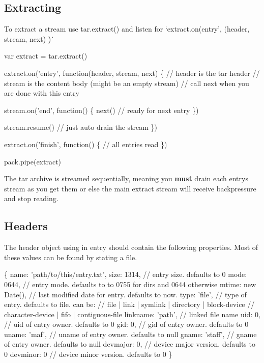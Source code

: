\subsection*{Extracting}

To extract a stream use {\ttfamily tar.\+extract()} and listen for `extract.\+on(\textquotesingle{}entry', (header, stream, next) )\`{}


\begin{DoxyCode}
var extract = tar.extract()

extract.on('entry', function(header, stream, next) \{
  // header is the tar header
  // stream is the content body (might be an empty stream)
  // call next when you are done with this entry

  stream.on('end', function() \{
    next() // ready for next entry
  \})

  stream.resume() // just auto drain the stream
\})

extract.on('finish', function() \{
  // all entries read
\})

pack.pipe(extract)
\end{DoxyCode}


The tar archive is streamed sequentially, meaning you {\bfseries must} drain each entry\textquotesingle{}s stream as you get them or else the main extract stream will receive backpressure and stop reading.

\subsection*{Headers}

The header object using in {\ttfamily entry} should contain the following properties. Most of these values can be found by stat\textquotesingle{}ing a file.


\begin{DoxyCode}
\{
  name: 'path/to/this/entry.txt',
  size: 1314,        // entry size. defaults to 0
  mode: 0644,        // entry mode. defaults to to 0755 for dirs and 0644 otherwise
  mtime: new Date(), // last modified date for entry. defaults to now.
  type: 'file',      // type of entry. defaults to file. can be:
                     // file | link | symlink | directory | block-device
                     // character-device | fifo | contiguous-file
  linkname: 'path',  // linked file name
  uid: 0,            // uid of entry owner. defaults to 0
  gid: 0,            // gid of entry owner. defaults to 0
  uname: 'maf',      // uname of entry owner. defaults to null
  gname: 'staff',    // gname of entry owner. defaults to null
  devmajor: 0,       // device major version. defaults to 0
  devminor: 0        // device minor version. defaults to 0
\}
\end{DoxyCode}


